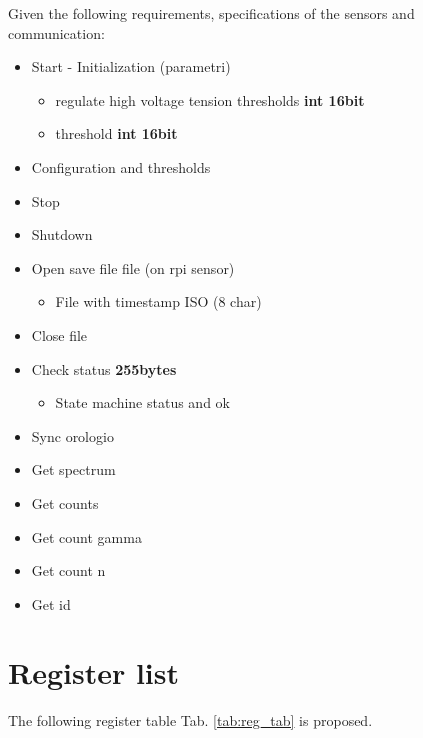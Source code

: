 \documentclass{article}
\begin{document}
Given the following requirements, specifications of the sensors and communication:
\begin{itemize}
    \item Start - Initialization (parametri)
        \begin{itemize}
            \item regulate high voltage tension thresholds \textbf{int 16bit}
            \item threshold \textbf{int 16bit}
        \end{itemize}
       
    \item Configuration and thresholds
    \item Stop
    \item Shutdown
    \item Open save file file (on rpi sensor)
        \begin{itemize}
            \item File with timestamp ISO (8 char)
        \end{itemize}
    \item Close file 
    \item Check status \textbf{255bytes}
        \begin{itemize}
            \item State machine status and ok
        \end{itemize}


    \item Sync orologio
    \item Get spectrum
    \item Get counts
    \item Get count gamma
    \item Get count n
    \item Get id
\end{itemize}



\section{Register list}
The following register table Tab. \ref{tab:reg_tab} is proposed.
\end{document}
